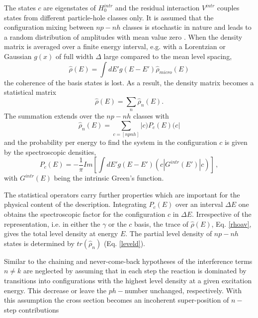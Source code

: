 \documentclass[twocolumn,amsmath,amssymb,10pt,groupedaddress,letter]{revtex4}
\begin{document}
\noindent The states $c$ are eigenstates of $H_{0}^{intr}$ and the residual
interaction $V^{intr}$ couples states from different particle-hole
classes only. It is assumed that the configuration mixing between
$np-nh$ classes is stochastic in nature and leads to a random distribution
of amplitudes with mean value zero \cite{LW92}. When the density
matrix is averaged over a finite energy interval, e.g. with a Lorentzian
or Gaussian $g(x)$ of full width $\Delta$ large compared to the
mean level spacing,
\begin{equation}
\hat{\rho}(E)=\int dE'g(E-E')\hat{\rho}_{micro}(E)\label{rhoav}
\end{equation}
\noindent the coherence of the basis states is lost. As a result, the density
matrix becomes a statistical matrix
\begin{equation}
\hat{\rho}(E)=\sum_{n}{\hat{\rho}_{n}(E)}.\label{levelc}
\end{equation}
\noindent The summation extends over the $np-nh$ classes with
\begin{equation}
\hat{\rho}_{n}(E)=\sum_{c=[npnh]}{|c)P_{c}(E)(c|}\label{leveld}
\end{equation}
\noindent and the probability per energy to find the system in the configuration
$c$ is given by the spectroscopic densities,
\begin{equation}
P_{c}(E)=-\frac{1}{\pi}Im[\int dE'g(E-E')(c|G^{intr}(E')|c)]\,,\label{specd}
\end{equation}
\noindent with $G^{intr}(E)$ being the intrinsic Green's function.

The statistical operators carry further properties which are important
for the physical content of the description. Integrating $P_{c}(E)$
over an interval $\Delta E$ one obtains the spectroscopic factor
for the configuration $c$ in $\Delta E$. Irrespective of the representation,
i.e. in either the $\gamma$ or the $c$ basis, the trace of $\hat{\rho}(E)$,
Eq. \ref{rhoav}, gives the total level density
at energy $E$. The partial level density of $np-nh$ states is determined
by $tr(\hat{\rho}_{n})$ (Eq. \ref{leveld}).

Similar to the chaining and never-come-back hypotheses of \cite{FKK}
the interference terms $n\ne k$ are neglected by assuming that in
each step the reaction is dominated by transitions into configurations
with the highest level density at a given excitation energy. This
decrease or leave the $ph-$number unchanged, respectively. With this
assumption the cross section becomes an incoherent super-position
of $n-$step contributions
\end{document}
